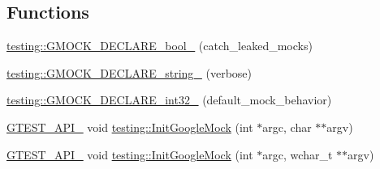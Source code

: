 \subsection*{Functions}
\begin{DoxyCompactItemize}
\item 
\mbox{\hyperlink{namespacetesting_a9dd7591091234b86ce48ce1aff6feeb5}{testing\+::\+G\+M\+O\+C\+K\+\_\+\+D\+E\+C\+L\+A\+R\+E\+\_\+bool\+\_\+}} (catch\+\_\+leaked\+\_\+mocks)
\item 
\mbox{\hyperlink{namespacetesting_a4dd099d1d538f26a16fcc2f94011b37e}{testing\+::\+G\+M\+O\+C\+K\+\_\+\+D\+E\+C\+L\+A\+R\+E\+\_\+string\+\_\+}} (verbose)
\item 
\mbox{\hyperlink{namespacetesting_a8db48e64b7ad3536f6ccf28ce39f9111}{testing\+::\+G\+M\+O\+C\+K\+\_\+\+D\+E\+C\+L\+A\+R\+E\+\_\+int32\+\_\+}} (default\+\_\+mock\+\_\+behavior)
\item 
\mbox{\hyperlink{_obj__test_2lib_2googletest-release-1_88_81_2googletest_2include_2gtest_2internal_2gtest-port_8h_aa73be6f0ba4a7456180a94904ce17790}{G\+T\+E\+S\+T\+\_\+\+A\+P\+I\+\_\+}} void \mbox{\hyperlink{namespacetesting_a32b1c6db9ba5133ccabfa67616b3c041}{testing\+::\+Init\+Google\+Mock}} (int $\ast$argc, char $\ast$$\ast$argv)
\item 
\mbox{\hyperlink{_obj__test_2lib_2googletest-release-1_88_81_2googletest_2include_2gtest_2internal_2gtest-port_8h_aa73be6f0ba4a7456180a94904ce17790}{G\+T\+E\+S\+T\+\_\+\+A\+P\+I\+\_\+}} void \mbox{\hyperlink{namespacetesting_a20fb86152763dddef67bc1dd8b090800}{testing\+::\+Init\+Google\+Mock}} (int $\ast$argc, wchar\+\_\+t $\ast$$\ast$argv)
\end{DoxyCompactItemize}
